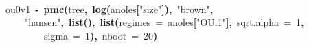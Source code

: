 \documentclass{elsarticle}
\makeatletter
\newcommand{\hlnumber}[1]{\textcolor[rgb]{0,0,0}{#1}}%
\newcommand{\hlfunctioncall}[1]{\textcolor[rgb]{.5,0,.33}{\textbf{#1}}}%
\newcommand{\hlstring}[1]{\textcolor[rgb]{.6,.6,1}{#1}}%
\newcommand{\hlkeyword}[1]{\textbf{#1}}%
\newcommand{\hlargument}[1]{\textcolor[rgb]{.69,.25,.02}{#1}}%
\newcommand{\hlassignement}[1]{\textbf{#1}}%
\newcommand{\hlsymbol}[1]{#1}%
\newcommand{\hlstd}[1]{\textcolor[rgb]{0,0,0}{#1}}%
\newenvironment{kframe}{%
 \def\FrameCommand##1{\hskip\@totalleftmargin \hskip-\fboxsep
 \colorbox{shadecolor}{##1}\hskip-\fboxsep
     \hskip-\linewidth \hskip-\@totalleftmargin \hskip\columnwidth}%
 \MakeFramed {\advance\hsize-\width
   \@totalleftmargin\z@ \linewidth\hsize
   \@setminipage}}%
 {\par\unskip\endMakeFramed}
\newenvironment{knitrout}{}{} %
\makeatother
\begin{document}
\begin{knitrout}
{\begin{kframe}
\begin{flushleft}
\hlstd{}\hspace*{\fill}\\
\hlstd{}\hlsymbol{ou0v1}{\ }\hlassignement{\usebox{\hlnormalsizeboxlessthan}-}{\ }\hlfunctioncall{pmc}\hlkeyword{(}\hlsymbol{tree}\hlkeyword{,}{\ }\hlfunctioncall{log}\hlkeyword{(}\hlsymbol{anoles}\hlkeyword{[}\hlstring{"{}size"{}}\hlkeyword{]}\hlkeyword{)}\hlkeyword{,}{\ }\hlstring{"{}brown"{}}\hlkeyword{,}\hspace*{\fill}\\
\hlstd{}{\ }{\ }{\ }{\ }\hlstring{"{}hansen"{}}\hlkeyword{,}{\ }\hlfunctioncall{list}\hlkeyword{(}\hlkeyword{)}\hlkeyword{,}{\ }\hlfunctioncall{list}\hlkeyword{(}\hlargument{regimes}{\ }\hlargument{=}{\ }\hlsymbol{anoles}\hlkeyword{[}\hlstring{"{}OU.1"{}}\hlkeyword{]}\hlkeyword{,}{\ }\hlargument{sqrt.alpha}{\ }\hlargument{=}{\ }\hlnumber{1}\hlkeyword{,}\hspace*{\fill}\\
\hlstd{}{\ }{\ }{\ }{\ }{\ }{\ }{\ }{\ }\hlargument{sigma}{\ }\hlargument{=}{\ }\hlnumber{1}\hlkeyword{)}\hlkeyword{,}{\ }\hlargument{nboot}{\ }\hlargument{=}{\ }\hlnumber{20}\hlkeyword{)}\mbox{}
\normalfont
\end{flushleft}
\end{kframe}}
\end{knitrout}
\end{document}
